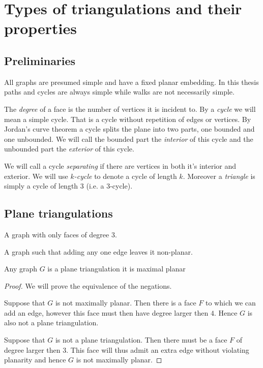 \section{Types of triangulations and their properties}
\subsection{Preliminaries}
All graphs are presumed simple and have a fixed planar embedding. In this thesis paths and cycles are always simple while walks are not necessarily simple.

The \emph{degree} of a face is the number of vertices it is incident to. By a \emph{cycle} we will mean a simple cycle. That is a cycle without repetition of edges or vertices. By Jordan's curve theorem a cycle splits the plane into two parts, one bounded and one unbounded. %
We will call the bounded part the \emph{interior} of this cycle and the unbounded part the \emph{exterior} of this cycle.

We will call a cycle \emph{separating} if there are vertices in both it's interior and exterior. We will use \emph{$k$-cycle} to denote a cycle of length $k$. Moreover a \emph{triangle} is simply a cycle of length $3$ (i.e. a $3$-cycle). 


\subsection{Plane triangulations}

\begin{defi} 
A graph with only faces of degree $3$.
\end{defi}


\begin{defi} 
A graph such that adding any one edge leaves it non-planar.
\end{defi}

\begin{thrm}
Any graph $G$ is a plane triangulation \ifftext it is maximal planar
\end{thrm}

\begin{proof}
We will prove the equivalence of the negations.

Suppose that $G$ is not maximally planar. Then there is a face $F$ to which we can add an edge, however this face must then have degree larger then $4$. Hence $G$ is also not a plane triangulation. 

Suppose that $G$ is not a plane triangulation. Then there must be a face $F$ of degree larger then $3$. This face will thus admit an extra edge without violating planarity and hence $G$ is not maximally planar.
\end{proof}

